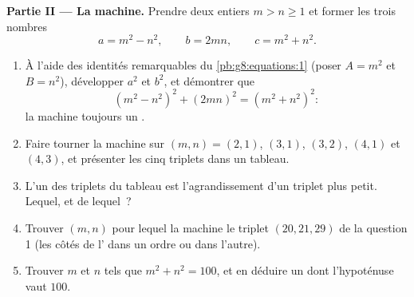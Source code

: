 \begin{problem}[{Devoir maison --- les triangles rectangles à côtés
entiers, et l'identité $(m^2 - n^2)^2 + (2mn)^2 = (m^2 + n^2)^2$ qui
les engendre tous}]
\medskip
\noindent\textbf{Partie II --- La machine.}
Prendre deux entiers $m > n \geq 1$ et former les trois nombres
\[
a = m^2 - n^2,
\qquad
b = 2mn,
\qquad
c = m^2 + n^2 .
\]
\begin{enumerate}[resume]
  \item À l'aide des identités remarquables du
        \cref{pb:g8:equations:1} (poser $A = m^2$ et $B = n^2$),
        développer $a^2$ et $b^2$, et démontrer que
        \[
        \left(m^2 - n^2\right)^2 + (2mn)^2
        = \left(m^2 + n^2\right)^2 :
        \]
        la machine  toujours un .
  \item Faire tourner la machine sur $(m, n) = (2, 1)$, $(3, 1)$,
        $(3, 2)$, $(4, 1)$ et $(4, 3)$, et présenter les cinq
        triplets dans un tableau.
  \item L'un des triplets du tableau est l'agrandissement d'un
        triplet plus petit. Lequel, et de lequel~?
  \item Trouver $(m, n)$ pour lequel la machine  le triplet
        $(20, 21, 29)$ de la question 1 (les côtés de l'
        dans un ordre ou dans l'autre).
  \item Trouver $m$ et $n$ tels que $m^2 + n^2 = 100$, et en déduire
        un  dont l'hypoténuse vaut $100$.
\end{enumerate}


\end{problem}
